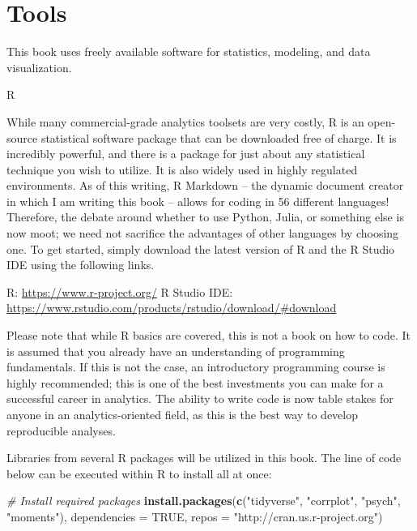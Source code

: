 \documentclass[]{book}
\newenvironment{Shaded}{\begin{snugshade}}{\end{snugshade}}
\newcommand{\CommentTok}[1]{\textcolor[rgb]{0.56,0.35,0.01}{\textit{#1}}}
\newcommand{\DataTypeTok}[1]{\textcolor[rgb]{0.13,0.29,0.53}{#1}}
\newcommand{\KeywordTok}[1]{\textcolor[rgb]{0.13,0.29,0.53}{\textbf{#1}}}
\newcommand{\NormalTok}[1]{#1}
\newcommand{\OtherTok}[1]{\textcolor[rgb]{0.56,0.35,0.01}{#1}}
\newcommand{\StringTok}[1]{\textcolor[rgb]{0.31,0.60,0.02}{#1}}
\begin{document}
\hypertarget{tools}{%
\section{Tools}\label{tools}}

This book uses freely available software for statistics, modeling, and data visualization.

 R

While many commercial-grade analytics toolsets are very costly, R is an open-source statistical software package that can be downloaded free of charge. It is incredibly powerful, and there is a package for just about any statistical technique you wish to utilize. It is also widely used in highly regulated environments. As of this writing, R Markdown -- the dynamic document creator in which I am writing this book -- allows for coding in 56 different languages! Therefore, the debate around whether to use Python, Julia, or something else is now moot; we need not sacrifice the advantages of other languages by choosing one. To get started, simply download the latest version of R and the R Studio IDE using the following links.

R: \url{https://www.r-project.org/}
R Studio IDE: \url{https://www.rstudio.com/products/rstudio/download/\#download}

Please note that while R basics are covered, this is not a book on how to code. It is assumed that you already have an understanding of programming fundamentals. If this is not the case, an introductory programming course is highly recommended; this is one of the best investments you can make for a successful career in analytics. The ability to write code is now table stakes for anyone in an analytics-oriented field, as this is the best way to develop reproducible analyses.

Libraries from several R packages will be utilized in this book. The line of code below can be executed within R to install all at once:

\begin{Shaded}
\begin{Highlighting}[]
\CommentTok{# Install required packages}
\KeywordTok{install.packages}\NormalTok{(}\KeywordTok{c}\NormalTok{(}\StringTok{"tidyverse"}\NormalTok{, }\StringTok{"corrplot"}\NormalTok{, }\StringTok{"psych"}\NormalTok{, }\StringTok{"moments"}\NormalTok{), }\DataTypeTok{dependencies =} \OtherTok{TRUE}\NormalTok{, }\DataTypeTok{repos =} \StringTok{"http://cran.us.r-project.org"}\NormalTok{)}
\end{Highlighting}
\end{Shaded}
\end{document}
